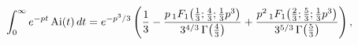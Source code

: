 \[\int_{0}^{\infty}e^{-pt}\mathop{\mathrm{Ai}\/}\nolimits\!\left(t\right)dt=e^{-%
p^{3}/3}\left(\frac{1}{3}-\frac{p\mathop{{{}_{1}F_{1}}\/}\nolimits\!\left(%
\tfrac{1}{3};\tfrac{4}{3};\tfrac{1}{3}p^{3}\right)}{3^{4/3}\mathop{\Gamma\/}%
\nolimits\!\left(\tfrac{4}{3}\right)}+\frac{p^{2}\mathop{{{}_{1}F_{1}}\/}%
\nolimits\!\left(\tfrac{2}{3};\tfrac{5}{3};\tfrac{1}{3}p^{3}\right)}{3^{5/3}%
\mathop{\Gamma\/}\nolimits\!\left(\tfrac{5}{3}\right)}\right),\]